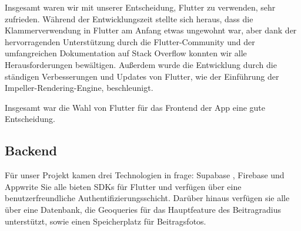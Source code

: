 Insgesamt waren wir mit unserer Entscheidung, Flutter zu verwenden, sehr zufrieden. Während der Entwicklungszeit stellte sich heraus, dass die Klammerverwendung in Flutter am Anfang etwas ungewohnt war, aber dank der hervorragenden Unterstützung durch die Flutter-Community und der umfangreichen Dokumentation auf Stack Overflow konnten wir alle Herausforderungen bewältigen. Außerdem wurde die Entwicklung durch die ständigen Verbesserungen und Updates von Flutter, wie der Einführung der Impeller-Rendering-Engine, beschleunigt. \cite{flutter_impeller}

Insgesamt war die Wahl von Flutter für das Frontend der App eine gute Entscheidung.

\subsection
{Backend}






Für unser Projekt kamen drei Technologien in frage: Supabase \cite{supabase}, Firebase\cite{firebase} und Appwrite\cite{appwrite} Sie alle bieten SDKs für Flutter und verfügen über eine benutzerfreundliche Authentifizierungsschicht. Darüber hinaus verfügen sie alle über eine Datenbank, die Geoqueries für das Hauptfeature des Beitragradius unterstützt, sowie einen Speicherplatz für Beitragsfotos.

